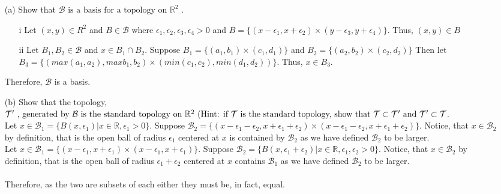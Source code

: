 \documentclass[12pt]{article}
\begin{document}
\begin{enumerate}
	\begin{enumerate}
		\item[(a)] Show that $ \mathcal { B } \text { is a basis for a topology on } \mathbb { R } ^ { 2 } \text { . } $\\
		\begin{enumerate}
			\item[i] Let $ (x,y)\in R^2 $ and $ B \in \mathcal{ B } $ where $ \epsilon_1, \epsilon_2, \epsilon_3, \epsilon_4 > 0 $ and $ B = \{(x-\epsilon_1,x+\epsilon_2)\times(y-\epsilon_3,y+\epsilon_4)\} $. Thus, $ (x,y) \in B $
			\item[ii] Let $ B_1, B_2 \in \mathcal{ B }$ and $ x\in B_1\cap B_2 $. Suppose $ B_1 = \{(a_1,b_1)\times(c_1,d_1)\} $  and $ B_2 = \{(a_2,b_2)\times(c_2,d_2)\}  $ Then let $ B_3 = \{(max(a_1,a_2),max{b_1,b_2})\times(min(c_1,c_2),min(d_1,d_2))\} $. Thus, $ x\in B_3 $.
		\end{enumerate}
		Therefore, $ \mathcal{ B } $ is a basis.
		\item[(b)]  Show that the topology,  $ \mathcal { T } ^ { \prime } \text { , generated by } \mathcal { B } \text { is the standard topology on } \mathbb { R } ^ { 2 } \text { (Hint: if } \mathcal { T } \text { is the } \\ \text{standard topology, show that } \mathcal { T } \subset \mathcal { T } ^ { \prime } \text { and } \mathcal { T } ^ { \prime } \subset \mathcal { T }$. \\
		Let $ x \in \mathcal{ B }_1 = \{B(x,\epsilon_1)|x\in\mathbb{ R },\epsilon_1>0\} $. Suppose $ \mathcal{B}_2 = \{(x-\epsilon_1-\epsilon_2,x+\epsilon_1+\epsilon_2)\times (x-\epsilon_1-\epsilon_2,x+\epsilon_1+\epsilon_2)\} $. Notice, that $ x \in \mathcal{B_2} $ by definition, that is the open ball of radius $ \epsilon_1 $ centered at $ x $ is contained by $ \mathcal{ B }_2 $ as we have defined $ \mathcal{ B }_2 $ to be larger.\\
		
		Let $ x \in \mathcal{B}_1 = \{(x-\epsilon_1,x+\epsilon_1)\times (x-\epsilon_1,x+\epsilon_1)\} $. Suppose $  \mathcal{ B }_2 = \{B(x,\epsilon_1+\epsilon_2)|x\in\mathbb{ R },\epsilon_1,\epsilon_2>0\}$. Notice, that $ x \in \mathcal{B}_2 $ by definition, that is the open ball of radius $ \epsilon_1 + \epsilon_2 $ centered at $ x $ contains $ \mathcal{ B }_1 $ as we have defined $ \mathcal{ B }_2 $ to be larger.\\
		\\
		Therefore, as the two are subsets of each either they must be, in fact, equal.
	\end{enumerate}
	

\end{enumerate}
\end{document}
